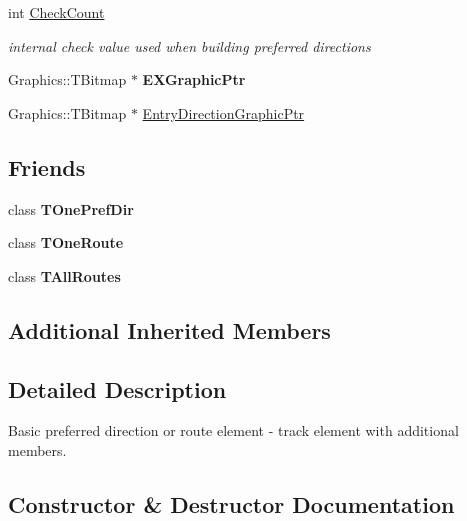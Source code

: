 \begin{DoxyCompactItemize}
\mbox{\label{class_t_pref_dir_element_aa6061a11fdf8dab01fe05febc8315707}} 
int \mbox{\hyperlink{class_t_pref_dir_element_aa6061a11fdf8dab01fe05febc8315707}{Check\+Count}}
\begin{DoxyCompactList}\small\item\em internal check value used when building preferred directions \end{DoxyCompactList}\item 
\mbox{\label{class_t_pref_dir_element_ab321e3e65eb5fd3f65d247dc551c535b}} 
Graphics\+::\+T\+Bitmap $\ast$ {\bfseries E\+X\+Graphic\+Ptr}
\item 
Graphics\+::\+T\+Bitmap $\ast$ \mbox{\hyperlink{class_t_pref_dir_element_a523e6fa892a5a25bda21436c23de6732}{Entry\+Direction\+Graphic\+Ptr}}
\end{DoxyCompactItemize}
\subsection*{Friends}
\begin{DoxyCompactItemize}
\item 
\mbox{\label{class_t_pref_dir_element_afdf92e6cc78ecd11a5dbdbee36cf58f2}} 
class {\bfseries T\+One\+Pref\+Dir}
\item 
\mbox{\label{class_t_pref_dir_element_ac066839379327510645d63c522dbe479}} 
class {\bfseries T\+One\+Route}
\item 
\mbox{\label{class_t_pref_dir_element_a1496675d125913310dc5b84b640a523d}} 
class {\bfseries T\+All\+Routes}
\end{DoxyCompactItemize}
\subsection*{Additional Inherited Members}


\subsection{Detailed Description}
Basic preferred direction or route element -\/ track element with additional members. 

\subsection{Constructor \& Destructor Documentation}
\mbox{\label{class_t_pref_dir_element_a0a06cd720bbc8e23a24d2e3b62f37de5}} 

